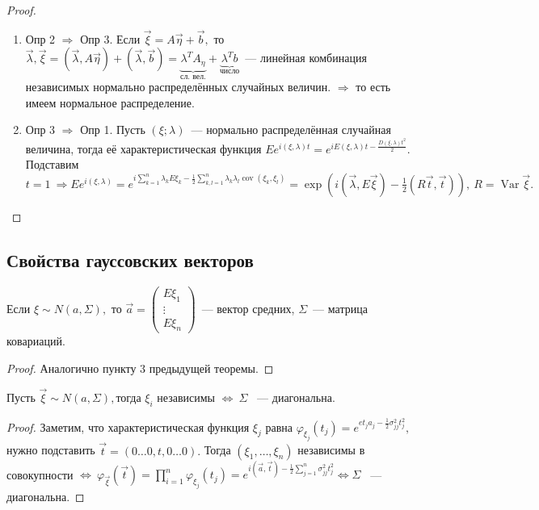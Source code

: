 \begin{proof}
\begin{enumerate}
    \item Опр 2 \(\Rightarrow\) Опр 3. Если \(\vec{\xi} = A\vec{\eta} + \vec{b},\) то \(\vec{\lambda}, \vec{\xi} = (\vec{\lambda}, A \vec{\eta}) + (\vec{\lambda}, \vec{b}) = \underbrace{\lambda^T A_\eta}_{\text{сл. вел.}} + \underbrace{\lambda^T b}_{\text{число}}\)~--- линейная комбинация независимых нормально распределённых случайных величин. \(\Rightarrow\) то есть имеем нормальное распределение.
    \item Опр 3 \(\Rightarrow\) Опр 1. Пусть \((\xi; \lambda)\)~--- нормально распределённая случайная величина, тогда её характеристическая функция \(Ee^{i(\xi, \lambda)t} = e^{iE(\xi, \lambda)t - \frac{D(\xi, \lambda)t^2}{2}}.\) Подставим \(t = 1 ~ \Rightarrow Ee^{i(\xi, \lambda)} = e^{i \sum\limits_{k = 1}^{n}\lambda_k E\xi_k - \frac{1}{2}\sum\limits_{k, l = 1}^{n}\lambda_k\lambda_l\operatorname{cov}(\xi_k, \xi_l)} = \exp(i(\vec{\lambda}, E\vec{\xi}) - \frac{1}{2}(R\vec{t}, \vec{t})), ~ R = \operatorname{Var}\vec{\xi}.\) 
		\end{enumerate}
	\end{proof}

	\subsection{Свойства гауссовских векторов}
	\setcounter{property}{0}
	\begin{property}
		Если \(\xi \sim N(a, \Sigma),\) то \(\vec{a} = \left(
		\begin{matrix}
		E\xi_1 \\ \vdots \\ E\xi_n
		\end{matrix}
		\right)\)~--- вектор средних, \(\Sigma\)~--- матрица ковариаций.
		\begin{proof}
			Аналогично пункту \(3\) предыдущей теоремы.
		\end{proof}
	\end{property}

	\begin{property}
		Пусть \(\vec{\xi}\sim N(a, \Sigma), \)тогда \(\xi_i\) независимы \(\Leftrightarrow~\Sigma\) ~--- диагональна.
		\begin{proof}
			Заметим, что характеристическая функция \(\xi_j\) равна \(\varphi_{\xi_j}(t_j) = e^{et_ja_j - \frac{1}{2}\sigma^2_{jj}t_j^2},\) нужно подставить \(\vec{t} = (0\ldots0, t, 0\ldots0).\) Тогда \((\xi_1, \ldots, \xi_n)\) независимы в совокупности \(\Leftrightarrow ~ \varphi_{\vec{\xi}}(\vec{t}) = \prod\limits_{i =1 }^n \varphi_{\xi_j}(t_j) = e^{i(\vec{a}, \vec{t}) - \frac{1}{2}\sum\limits_{j = 1}^{n}\sigma_{jj}^2t_j^2} \Leftrightarrow \Sigma\) ~--- диагональна.
		\end{proof}
	\end{property}

